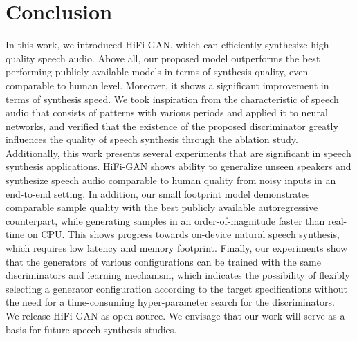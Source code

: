 \section{Conclusion}
In this work, we introduced HiFi-GAN, which can efficiently synthesize high quality speech audio. 
Above all, our proposed model outperforms the best performing publicly available models in terms of synthesis quality, even comparable to human level. Moreover, it shows a significant improvement in terms of synthesis speed.
We took inspiration from the characteristic of speech audio that consists of patterns with various periods and applied it to neural networks, and verified that the existence of the proposed discriminator greatly influences the quality of speech synthesis through the ablation study. 
Additionally, this work presents several experiments that are significant in speech synthesis applications. 
HiFi-GAN shows ability to generalize unseen speakers and synthesize speech audio comparable to human quality from noisy inputs in an end-to-end setting.
In addition, our small footprint model demonstrates comparable sample quality with the best publicly available autoregressive counterpart, while generating samples in an order-of-magnitude faster than real-time on CPU. This shows progress towards on-device natural speech synthesis, which requires low latency and memory footprint.
Finally, our experiments show that the generators of various configurations can be trained with the same discriminators and learning mechanism, which indicates the possibility of flexibly selecting a generator configuration according to the target specifications without the need for a time-consuming hyper-parameter search for the discriminators. \\
We release HiFi-GAN as open source. We envisage that our work will serve as a basis for future speech synthesis studies.
